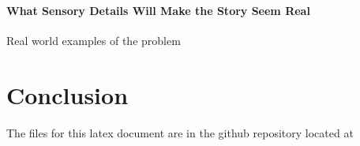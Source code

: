\documentclass[conference]{IEEEtran}
\begin{document}
\paragraph{What Sensory Details Will Make the Story Seem Real}
Real world examples of the problem

\section{Conclusion}

The files for this latex document are in the github repository located at 

\nocite{*}



\end{document}
